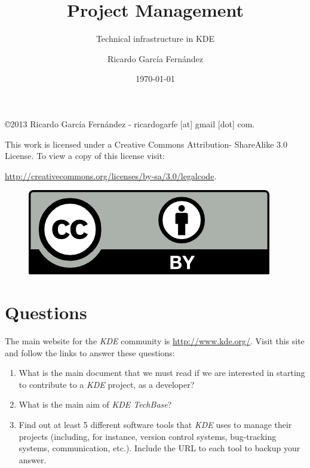 \documentclass[11pt]{scrartcl}
\title{\textbf{Project Management}}
\subtitle{Technical infrastructure in KDE}
\author{Ricardo Garc\'ia Fern\'andez}
\date{\today}
\begin{document}
\maketitle

\vfill

\begin{flushright}
    \copyright  2013 Ricardo Garc\'ia Fern\'andez - ricardogarfe [at] gmail [dot] com.

    This work is licensed under a Creative Commons Attribution- ShareAlike 3.0 License.
    To view a copy of this license visit:
 
    \url{http://creativecommons.org/licenses/by-sa/3.0/legalcode}.
\end{flushright}

\begin{figure}[h]
    \begin{flushright}	
        \includegraphics{by}
        \label{fig:by-sa}
    \end{flushright}
\end{figure}

\newpage

\section{Questions}

The main website for the \emph{KDE} community is \url{http://www.kde.org/}. Visit this site and follow the links to answer these questions:

\begin{enumerate}
	\item What is the main document that we must read if we are interested in starting to contribute to a \emph{KDE} project, as a developer?
	\item What is the main aim of \emph{KDE TechBase}?
	\item Find out at least 5 different software tools that \emph{KDE} uses to manage their projects (including, for instance, version control systems, bug-tracking systems, communication, etc.). Include the URL to each tool to backup your answer.
\end{enumerate}
\end{document}
